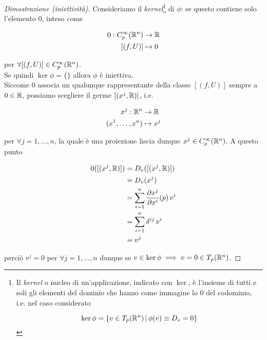 \begin{proof}[Dimostrazione (iniettività)]
	Consideriamo il \textit{kernel}\footnote{%
	Il \textit{kernel} o nucleo di un'applicazione, indicato con $ \ker $, è l'insieme di tutti e soli gli elementi del dominio che hanno come immagine lo $ 0 $ del codominio, i.e. nel caso considerato
	
	\begin{equation}
		\ker \phi = \left\{ v \in T_{p}(\mathbb{R}^{n}) \, \middle| \, \phi(v) \equiv D_{v} = 0 \right\}
	\end{equation}%
	} di $ \phi $: se questo contiene solo l'elemento $ 0 $, inteso come
	
	\begin{align}
		\begin{split}
			0 : C_{p}^{\infty}(\mathbb{R}^{n}) &\to \mathbb{R}\\
			[(f,U)] &\mapsto 0
		\end{split}
	\end{align}

	per $ \forall [(f,U)] \in C_{p}^{\infty}(\mathbb{R}^{n}) $.\\
	Se quindi $ \ker \phi = \{\} $ allora $ \phi $ è iniettiva.\\
	Siccome $ 0 $ associa un qualunque rappresentante della classe $ [(f,U)] $ sempre a $ 0 \in \mathbb{R} $, possiamo scegliere il germe $ [(x^{j},\mathbb{R})] $, i.e.
	
	\begin{align}
		\begin{split}
			x^{j} : \mathbb{R}^{n} &\to \mathbb{R}\\
			(x^{1},\dots,x^{n}) &\mapsto x^{j}
		\end{split}
	\end{align}

	per $ \forall j=1,\dots,n $, la quale è una proiezione liscia dunque $ x^{j} \in C_{p}^{\infty}(\mathbb{R}^{n}) $. A questo punto
	
	\begin{align}
		\begin{split}
			0([(x^{j},\mathbb{R})]) &= D_{v} ([(x^{j},\mathbb{R})])\\
			&= D_{v} (x^{j})\\
			&= \sum_{i=1}^{n} \dfrac{\partial x^{j}}{\partial x^{i}} (p) \, v^{i}\\
			&= \sum_{i=1}^{n} \delta^{ij} \, v^{i}\\
			&= v^{j}
		\end{split}
	\end{align}

	perciò $ v^{j} = 0 $ per $ \forall j=1,\dots,n $ dunque se $ v \in \ker \phi \implies v = 0 \in T_{p}(\mathbb{R}^{n}) $.
\end{proof}

